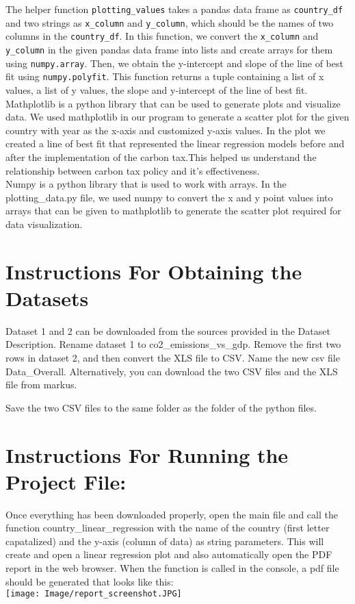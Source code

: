 \documentclass[fontsize=11pt]{article}
\begin{document}
\noindent The helper function \texttt {plotting\_values} takes a pandas data frame as \texttt {country\_df} and two strings as \texttt {x\_column} and \texttt {y\_column}, which should be the names of two columns in the \texttt {country\_df}. In this function, we convert the \texttt {x\_column} and \texttt {y\_column} in the given pandas data frame into lists and create arrays for them using \texttt {numpy.array}. Then, we obtain the y-intercept and slope of the line of best fit using \texttt {numpy.polyfit}. This function returns a tuple containing a list of x values, a list of y values, the slope and y-intercept of the line of best fit.\\

\noindent Mathplotlib is a python library that can be used to generate plots and visualize data. We used mathplotlib in our program to generate a scatter plot for the given country with year as the x-axis and customized y-axis values. In the plot we created a line of best fit that represented the linear regression models before and after the implementation of the carbon tax.This helped us understand the relationship between carbon tax policy and it's effectiveness. \\

\noindent Numpy is a python library that is used to work with arrays. In the plotting\_data.py file, we used numpy to convert the x and y point values into arrays that can be given to mathplotlib to generate the scatter plot required for data visualization.


\section*{Instructions For Obtaining the Datasets}
Dataset 1 and 2 can be downloaded from the sources provided in the Dataset Description. Rename dataset 1 to co2\_emissions\_vs\_gdp. Remove the first two rows in dataset 2, and then convert the XLS file to CSV. Name the new csv file Data\_Overall. Alternatively, you can download the two CSV files and the XLS file from markus.

\noindent Save the two CSV files to the same folder as the folder of the python files.


\section*{Instructions For Running the Project File:}
\noindent Once everything has been downloaded properly, open the main file and call the function country\_linear\_regression with the name of the country (first letter capatalized) and the y-axis (column of data) as string parameters. This will create and open a linear regression plot and also automatically open the PDF report in the web browser.
When the function is called in the console, a pdf file should be generated that looks like this:\\
\texttt{[image: Image/report\_screenshot.JPG]}
\end{document}

